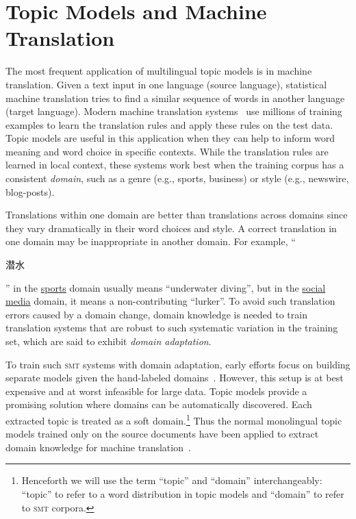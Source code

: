 \section{Topic Models and Machine Translation}

The most frequent application of multilingual topic models is in machine translation.
Given a text input in one language (source language), statistical
machine translation tries to find a similar sequence of words in another
language (target language). Modern machine translation
systems~\citep{koehn-09} use millions of training examples to learn
the translation rules and apply these rules on the test data. 
Topic models are useful in this application when they can help to inform word meaning and word choice in specific contexts.
While the translation rules are learned in local context, these systems work
best when the training corpus has a consistent \emph{domain}, such as a
 genre (e.g., sports, business) or style (e.g.,
newswire, blog-posts). 

Translations within one domain are better than translations across
domains since they vary dramatically in their word choices and style.
A correct translation in one domain may be inappropriate in another
domain.  For example, ``\begin{CJK*}{UTF8}{gbsn}潜水\end{CJK*}'' in the
  \underline{sports} domain usually means ``underwater diving'', but
  in the \underline{social media} domain, it means a non-contributing
  ``lurker''. To avoid such translation errors caused by a domain
  change, domain knowledge is needed to train translation systems that
  are robust to such systematic variation in the training set, which
  are said to exhibit \emph{domain adaptation}.

To train such \textsc{smt} systems with domain adaptation, early
efforts focus on building separate models given the hand-labeled
domains~\citep{foster-07,matsoukas-09,chiang-11}. However, this setup
is at best expensive and at worst infeasible for large data.  Topic
models provide a promising solution where domains can be automatically
discovered. Each extracted topic is treated as a soft
domain.\footnote{Henceforth we will use the term ``topic'' and
  ``domain'' interchangeably: ``topic'' to refer to  a word distribution in
  topic models and ``domain'' to refer to \textsc{smt} corpora.} Thus
the normal monolingual topic models trained only on the source documents have
been applied to extract domain knowledge for machine
translation~\citep{Eidelman-12}.

